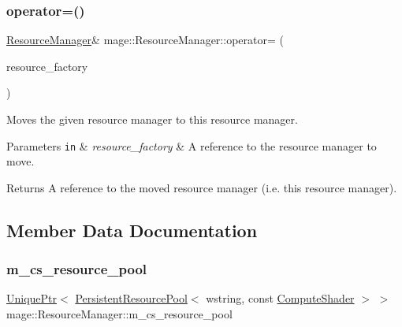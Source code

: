 \subsubsection{\texorpdfstring{operator=()}{operator=()}\hspace{0.1cm}{\footnotesize\ttfamily [2/2]}}
{\footnotesize\ttfamily \hyperlink{classmage_1_1_resource_manager}{Resource\+Manager}\& mage\+::\+Resource\+Manager\+::operator= (\begin{DoxyParamCaption}\item[{\hyperlink{classmage_1_1_resource_manager}{Resource\+Manager} \&\&}]{resource\+\_\+factory }\end{DoxyParamCaption})\hspace{0.3cm}{\ttfamily [delete]}}

Moves the given resource manager to this resource manager.


\begin{DoxyParams}[1]{Parameters}
\mbox{\tt in}  & {\em resource\+\_\+factory} & A reference to the resource manager to move. \\
\hline
\end{DoxyParams}
\begin{DoxyReturn}{Returns}
A reference to the moved resource manager (i.\+e. this resource manager). 
\end{DoxyReturn}


\subsection{Member Data Documentation}
\hypertarget{classmage_1_1_resource_manager_a5c363073fa94f73193faaa1f65365299}{}\label{classmage_1_1_resource_manager_a5c363073fa94f73193faaa1f65365299} 
\subsubsection{\texorpdfstring{m\+\_\+cs\+\_\+resource\+\_\+pool}{m\_cs\_resource\_pool}}
{\footnotesize\ttfamily \hyperlink{namespacemage_a3316d7143a973e37adf1110f2e80ca31}{Unique\+Ptr}$<$ \hyperlink{classmage_1_1_persistent_resource_pool}{Persistent\+Resource\+Pool}$<$ wstring, const \hyperlink{namespacemage_af219172e81f21ea8002b17b1efbb25e0}{Compute\+Shader} $>$ $>$ mage\+::\+Resource\+Manager\+::m\+\_\+cs\+\_\+resource\+\_\+pool\hspace{0.3cm}{\ttfamily [private]}}

